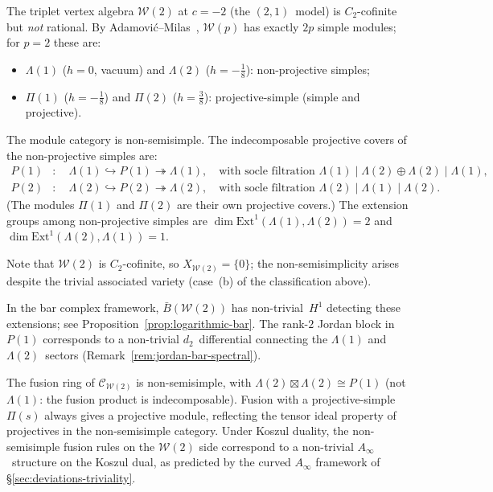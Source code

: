\begin{example}[Triplet \texorpdfstring{$\mathcal{W}(p)$}{W(p)} at \texorpdfstring{$c = c_{2,1} = -2$}{c = c(2,1) = -2}]
\label{ex:triplet-logarithmic}
The triplet vertex algebra $\mathcal{W}(2)$ at $c = -2$
(the $(2,1)$~model) is $C_2$-cofinite but \emph{not} rational.
By Adamovi\'c--Milas~\cite{AdamovicMilas2008}, $\mathcal{W}(p)$ has exactly $2p$ simple
modules; for $p = 2$ these are:
\begin{itemize}
\item $\Lambda(1)$ ($h = 0$, vacuum) and
$\Lambda(2)$ ($h = -\tfrac{1}{8}$): non-projective simples;
\item $\Pi(1)$ ($h = -\tfrac{1}{8}$) and
$\Pi(2)$ ($h = \tfrac{3}{8}$): projective-simple (simple and
projective).
\end{itemize}
The module category is non-semisimple.  The indecomposable
projective covers of the non-projective simples are:
\begin{align}
P(1) &: \quad \Lambda(1) \hookrightarrow P(1) \twoheadrightarrow
\Lambda(1), \quad \text{with socle filtration }
\Lambda(1) \mid \Lambda(2) \oplus \Lambda(2) \mid
\Lambda(1), \\
P(2) &: \quad \Lambda(2) \hookrightarrow P(2) \twoheadrightarrow
\Lambda(2), \quad \text{with socle filtration }
\Lambda(2) \mid \Lambda(1) \mid \Lambda(2).
\end{align}
(The modules $\Pi(1)$ and $\Pi(2)$ are their own projective covers.)
The extension groups among non-projective simples are
$\dim \mathrm{Ext}^1(\Lambda(1), \Lambda(2)) = 2$
and $\dim \mathrm{Ext}^1(\Lambda(2), \Lambda(1)) = 1$.

Note that $\mathcal{W}(2)$ is $C_2$-cofinite, so
$X_{\mathcal{W}(2)} = \{0\}$; the non-semisimplicity arises
despite the trivial associated variety (case~(b) of the
classification above).

In the bar complex framework,
$\bar{B}(\mathcal{W}(2))$ has non-trivial~$H^1$
detecting these extensions;
see Proposition~\ref{prop:logarithmic-bar}.
The rank-$2$ Jordan block in~$P(1)$ corresponds to
a non-trivial $d_2$~differential connecting
the $\Lambda(1)$ and $\Lambda(2)$~sectors
(Remark~\ref{rem:jordan-bar-spectral}).

The fusion ring of $\mathcal{C}_{\mathcal{W}(2)}$ is
non-semisimple, with
$\Lambda(2) \boxtimes \Lambda(2) \cong P(1)$
(not $\Lambda(1)$: the fusion product is indecomposable).
Fusion with a projective-simple $\Pi(s)$ always gives a
projective module, reflecting the tensor ideal property of
projectives in the non-semisimple category.
Under Koszul duality, the non-semisimple fusion rules on the
$\mathcal{W}(2)$ side correspond to a non-trivial
$A_\infty$~structure on the Koszul dual, as predicted by the
curved $A_\infty$ framework of
\S\ref{sec:deviations-triviality}.
\end{example}

